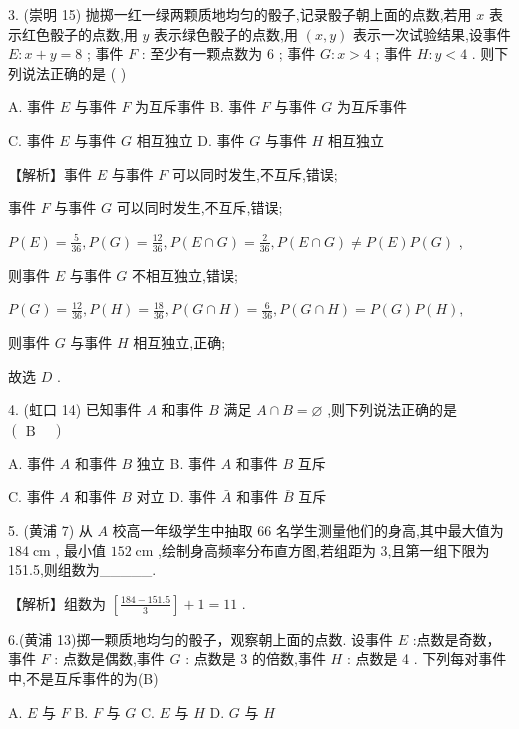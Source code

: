 \documentclass[10pt]{article}
\begin{document}
3. (崇明 15) 抛掷一红一绿两颗质地均匀的骰子,记录骰子朝上面的点数,若用 \(x\) 表示红色骰子的点数,用 \(y\) 表示绿色骰子的点数,用 \(\left( {x,y}\right)\) 表示一次试验结果,设事件 \(E : x + y = 8\) ; 事件 \(F\) : 至少有一颗点数为 6 ; 事件 \(G : x > 4\) ; 事件 \(H : y < 4\) . 则下列说法正确的是 ( )

A. 事件 \(E\) 与事件 \(F\) 为互斥事件 B. 事件 \(F\) 与事件 \(G\) 为互斥事件

C. 事件 \(E\) 与事件 \(G\) 相互独立 D. 事件 \(G\) 与事件 \(H\) 相互独立

【解析】事件 \(E\) 与事件 \(F\) 可以同时发生,不互斥,错误;

事件 \(F\) 与事件 \(G\) 可以同时发生,不互斥,错误;

\(P\left( E\right)  = \frac{5}{36},P\left( G\right)  = \frac{12}{36},P\left( {E \cap  G}\right)  = \frac{2}{36},P\left( {E \cap  G}\right)  \neq  P\left( E\right) P\left( G\right)\) ,

则事件 \(E\) 与事件 \(G\) 不相互独立,错误;

\(P\left( G\right)  = \frac{12}{36},P\left( H\right)  = \frac{18}{36},P\left( {G \cap  H}\right)  = \frac{6}{36},P\left( {G \cap  H}\right)  = P\left( G\right) P\left( H\right) ,\)

则事件 \(G\) 与事件 \(H\) 相互独立,正确;

故选 \(D\) .

4. (虹口 14) 已知事件 \(A\) 和事件 \(B\) 满足 \(A \cap  B = \varnothing\) ,则下列说法正确的是 \(\left( \begin{array}{ll} \mathrm{B} &  \end{array}\right)\)

A. 事件 \(A\) 和事件 \(B\) 独立 B. 事件 \(A\) 和事件 \(B\) 互斥

C. 事件 \(A\) 和事件 \(B\) 对立 D. 事件 \(\bar{A}\) 和事件 \(\bar{B}\) 互斥

5. (黄浦 7) 从 \(A\) 校高一年级学生中抽取 66 名学生测量他们的身高,其中最大值为 \({184}\mathrm{\;{cm}}\) , 最小值 \({152}\mathrm{\;{cm}}\) ,绘制身高频率分布直方图,若组距为 3,且第一组下限为151.5,则组数为\_\_\_\_\_.

【解析】组数为 \(\left\lbrack  \frac{{184} - {151.5}}{3}\right\rbrack   + 1 = {11}\) .

6.(黄浦 13)掷一颗质地均匀的骰子，观察朝上面的点数. 设事件 \(E\) :点数是奇数，事件 \(F\) : 点数是偶数,事件 \(G\) : 点数是 3 的倍数,事件 \(H\) : 点数是 4 . 下列每对事件中,不是互斥事件的为(B)

A. \(E\) 与 \(F\) B. \(F\) 与 \(G\) C. \(E\) 与 \(H\) D. \(G\) 与 \(H\)
\end{document}
